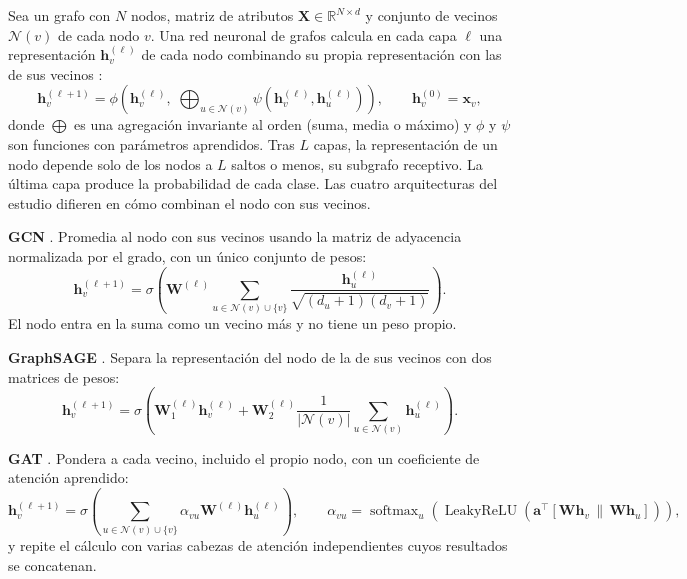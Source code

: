 Sea un grafo con $N$ nodos, matriz de atributos $\mathbf{X} \in \mathbb{R}^{N \times d}$ y
conjunto de vecinos $\mathcal{N}(v)$ de cada nodo $v$. Una red neuronal de grafos calcula en
cada capa $\ell$ una representación $\mathbf{h}_v^{(\ell)}$ de cada nodo combinando su propia
representación con las de sus vecinos \cite{Scarselli2009GNN, Wu2021Survey, Zhou2020Review}:
\begin{equation}
  \mathbf{h}_v^{(\ell+1)} = \phi\!\left(\mathbf{h}_v^{(\ell)},\;
  \bigoplus_{u \in \mathcal{N}(v)} \psi\!\left(\mathbf{h}_v^{(\ell)}, \mathbf{h}_u^{(\ell)}\right)\right),
  \qquad \mathbf{h}_v^{(0)} = \mathbf{x}_v,
\end{equation}
donde $\bigoplus$ es una agregación invariante al orden (suma, media o máximo) y $\phi$ y
$\psi$ son funciones con parámetros aprendidos. Tras $L$ capas, la representación de un nodo
depende solo de los nodos a $L$ saltos o menos, su subgrafo receptivo. La última capa produce
la probabilidad de cada clase. Las cuatro arquitecturas del estudio difieren en cómo combinan
el nodo con sus vecinos.

\textbf{GCN} \cite{Kipf2017GCN}. Promedia al nodo con sus vecinos usando la matriz de adyacencia
normalizada por el grado, con un único conjunto de pesos:
\begin{equation}
  \mathbf{h}_v^{(\ell+1)} = \sigma\!\left(\mathbf{W}^{(\ell)} \sum_{u \in \mathcal{N}(v) \cup \{v\}}
  \frac{\mathbf{h}_u^{(\ell)}}{\sqrt{(d_u + 1)(d_v + 1)}}\right).
\end{equation}
El nodo entra en la suma como un vecino más y no tiene un peso propio.

\textbf{GraphSAGE} \cite{Hamilton2017GraphSAGE}. Separa la representación del nodo de la de sus
vecinos con dos matrices de pesos:
\begin{equation}
  \mathbf{h}_v^{(\ell+1)} = \sigma\!\left(\mathbf{W}_1^{(\ell)} \mathbf{h}_v^{(\ell)} +
  \mathbf{W}_2^{(\ell)} \frac{1}{|\mathcal{N}(v)|} \sum_{u \in \mathcal{N}(v)} \mathbf{h}_u^{(\ell)}\right).
\end{equation}

\textbf{GAT} \cite{Velickovic2018GAT}. Pondera a cada vecino, incluido el propio nodo, con un
coeficiente de atención aprendido:
\begin{equation}
  \mathbf{h}_v^{(\ell+1)} = \sigma\!\left(\sum_{u \in \mathcal{N}(v) \cup \{v\}} \alpha_{vu}
  \mathbf{W}^{(\ell)} \mathbf{h}_u^{(\ell)}\right), \qquad
  \alpha_{vu} = \operatorname{softmax}_u\!\left(\operatorname{LeakyReLU}\!\left(\mathbf{a}^\top
  [\mathbf{W}\mathbf{h}_v \,\|\, \mathbf{W}\mathbf{h}_u]\right)\right),
\end{equation}
y repite el cálculo con varias cabezas de atención independientes cuyos resultados se
concatenan.

